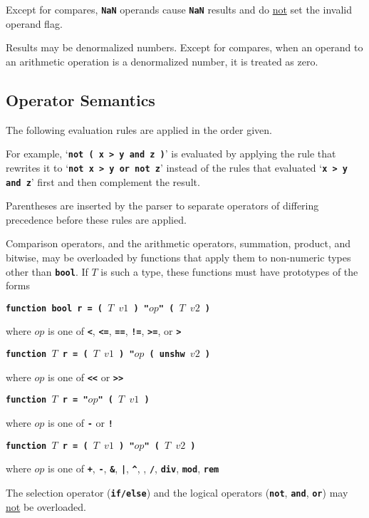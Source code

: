 \documentclass[12pt]{article}
\newcommand{\TT}[1]{{\tt \bfseries #1}}
\newenvironment{indpar}[1][0.3in]%
	{\begin{list}{}%
		     {\setlength{\itemsep}{0in}%
		      \setlength{\topsep}{0in}%
		      \setlength{\parsep}{1ex}%
		      \setlength{\labelwidth}{#1}%
		      \setlength{\leftmargin}{#1}%
		      \addtolength{\leftmargin}{\labelsep}}%
	 \item}%
	{\end{list}}
\begin{document}
Except for compares, \TT{NaN} operands cause \TT{NaN} results and
do \underline{not} set the invalid operand flag.

Results may be denormalized numbers.  Except for compares,
when an operand to an arithmetic operation is a denormalized
number, it is treated as zero.

\subsection{Operator Semantics}

The following evaluation rules are applied in the order given.

For example, `\TT{not ( x > y and z )}' is evaluated by applying
the rule that rewrites it to `\TT{not x > y or not z}' instead of
the rules that evaluated `\TT{x > y and z}' first and then complement
the result.

Parentheses are inserted by the parser to separate operators of
differing precedence before these rules are applied.

Comparison operators, and the
arithmetic operators, summation, product, and bitwise, 
may be overloaded by functions that apply them to non-numeric
types other than \TT{bool}.
If $T$ is such a type, these functions must have prototypes
of the forms
\begin{indpar}
\TT{function bool r = ( $T$ $v1$ ) "$op$" ( $T$ $v2$ )}
\begin{indpar}
where $op$ is one of \TT{<}, \TT{<=}, \TT{==}, \TT{!=}, \TT{>=}, or \TT{>}
\end{indpar}

\TT{function $T$ r = ( $T$ $v1$ ) "$op$ ( unshw $v2$ )}
\begin{indpar}
where $op$ is one of \TT{<{}<} or \TT{>{}>}
\end{indpar}

\TT{function $T$ r = "$op$" ( $T$ $v1$ )}
\begin{indpar}
where $op$ is one of \TT{-} or \TT{!}
\end{indpar}

\TT{function $T$ r = ( $T$ $v1$ ) "$op$" ( $T$ $v2$ )}
\begin{indpar}
where $op$ is one of
    \TT{+}, \TT{-}, \TT{\&}, \TT{|}, \TT{\textasciicircum},
    \TT{*}, \TT{/}, \TT{div}, \TT{mod}, \TT{rem}
\end{indpar}
\end{indpar}


The selection operator (\TT{if/else}) and the logical
operators (\TT{not}, \TT{and}, \TT{or}) may \underline{not}
be overloaded.
\end{document}
